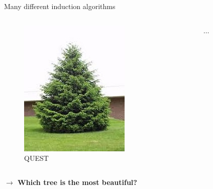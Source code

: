 \documentclass[english]{beamer}
\begin{document}
\begin{frame}{Many different induction algorithms}
\begin{columns}
\begin{column}{0.25\textwidth}
\begin{figure}
				\includegraphics[width=\textwidth]{figures/spar.jpg}
				\caption{QUEST}
			\end{figure}
		\end{column}
		\begin{column}{0.25\textwidth}
			\centering
			$\ldots$
		\end{column}
	\end{columns}
	
	\textbf{$\rightarrow$ Which tree is the most beautiful?}
\end{frame}
\end{document}
